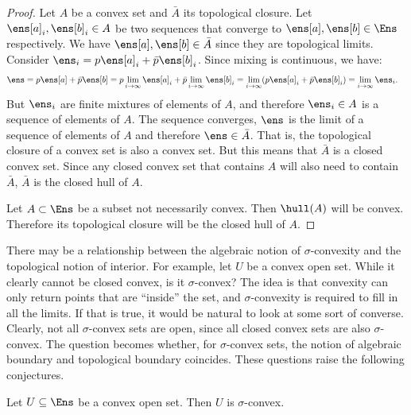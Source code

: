 \begin{mathSection}
\begin{proof}
	Let $A$ be a convex set and $\bar{A}$ its topological closure. Let $\ens[a]_i, \ens[b]_i \in A$ be two sequences that converge to $\ens[a], \ens[b] \in \Ens$ respectively. We have $\ens[a], \ens[b] \in \bar{A}$ since they are topological limits. Consider $\ens_i = p \ens[a]_i + \bar{p} \ens[b]_i$. Since mixing is continuous, we have:
	\begin{equation}
		\begin{aligned}
			\ens &= p \ens[a] + \bar{p} \ens[b] = p \lim\limits_{i \to \infty} \ens[a]_i + \bar{p} \lim\limits_{i \to \infty} \ens[b]_i = \lim\limits_{i \to \infty} (p \ens[a]_i + \bar{p} \ens[b]_i) = \lim\limits_{i \to \infty} \ens_i.
		\end{aligned}
	\end{equation}
	But $\ens_i$ are finite mixtures of elements of $A$, and therefore $\ens_i \in A$ is a sequence of elements of $A$. The sequence converges, $\ens$ is the limit of a sequence of elements of $A$ and therefore $\ens \in \bar{A}$. That is, the topological closure of a convex set is also a convex set. But this means that $\bar{A}$ is a closed convex set. Since any closed convex set that contains $A$ will also need to contain $\bar{A}$, $\bar{A}$ is the closed hull of $A$.

	Let $A \subset \Ens$ be a subset not necessarily convex. Then $\hull(A)$ will be convex. Therefore its topological closure will be the closed hull of $A$.
\end{proof}
\end{mathSection}

There may be a relationship between the algebraic notion of $\sigma$-convexity and the topological notion of interior. For example, let $U$ be a convex open set. While it clearly cannot be closed convex, is it $\sigma$-convex? The idea is that convexity can only return points that are ``inside'' the set, and $\sigma$-convexity is required to fill in all the limits. If that is true, it would be natural to look at some sort of converse. Clearly, not all $\sigma$-convex sets are open, since all closed convex sets are also $\sigma$-convex. The question becomes whether, for $\sigma$-convex sets, the notion of algebraic boundary and topological boundary coincides. These questions raise the following conjectures.

\begin{conj}\label{convexOpenIsSigmaConvex}
	Let $U \subseteq \Ens$ be a convex open set. Then $U$ is $\sigma$-convex.
\end{conj}


